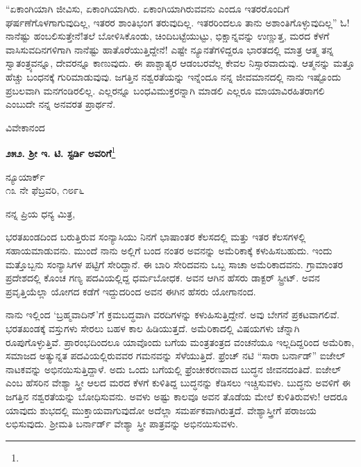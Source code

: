 \vspace{0.1cm}

“ಏಕಾಂಗಿಯಾಗಿ ಜೀವಿಸು, ಏಕಾಂಗಿಯಾಗಿರು. ಏಕಾಂಗಿಯಾಗಿರುವವನು ಎಂದೂ ಇತರರೊಂದಿಗೆ ಘರ್ಷಣೆಗೊಳಗಾಗುವುದಿಲ್ಲ, ಇತರರ ಶಾಂತಿಭಂಗ ತರುವುದಿಲ್ಲ. ಇತರರಿಂದಲೂ ತಾನು ಅಶಾಂತಿಗೊಳ್ಳುವುದಿಲ್ಲ” ಓ!ನಾನೆಷ್ಟು ಹಂಬಲಿಸುತ್ತೇನೆ!ತಲೆ ಬೋಳಿಸಿಕೊಂಡು, ಚಿಂದಿಬಟ್ಟೆಯುಟ್ಟು, ಭಿಕ್ಷಾನ್ನವನ್ನು ಉಣ್ಣುತ್ತ, ಮರದ ಕೆಳಗೆ ವಾಸಿಸುವದಿನಗಳಿಗಾಗಿ ನಾನೆಷ್ಟು ಹಾತೊರೆಯುತ್ತಿದ್ದೇನೆ! ಎಷ್ಟೇ ನ್ಯೂನತೆಗಳಿದ್ದರೂ ಭಾರತದಲ್ಲಿ ಮಾತ್ರ ಆತ್ಮ ತನ್ನ ಸ್ವಾತಂತ್ರ್ಯವನ್ನೂ, ದೇವರನ್ನೂ ಕಾಣುವುದು. ಈ ಪಾಶ್ಚಾತ್ಯರ ಆಡಂಬರವೆಲ್ಲ ಕೇವಲ ನಿಸ್ಸಾರವಾದುವು. ಆತ್ಮನನ್ನು ಮತ್ತೂ ಹೆಚ್ಚು ಬಂಧನಕ್ಕೆ ಗುರಿಮಾಡುವುವು. ಜಗತ್ತಿನ ನಶ್ವರತೆಯನ್ನು ಇನ್ನೆಂದೂ ನನ್ನ ಜೀವಮಾನದಲ್ಲಿ ನಾನು ಇಷ್ಟೊಂದು ಪ್ರಬಲವಾಗಿ ಮನಗಂಡಿರಲಿಲ್ಲ. ಎಲ್ಲರನ್ನೂ ಬಂಧವಿಮುಕ್ತರನ್ನಾಗಿ ಮಾಡಲಿ \enginline{-} ಎಲ್ಲರೂ ಮಾಯಾವಿರಹಿತರಾಗಲಿ ಎಂಬುದೇ ನನ್ನ ಅನವರತ ಪ್ರಾರ್ಥನೆ.

{\flushright
ವಿವೇಕಾನಂದ\par}

\begin{center}
\textbf{೨೫೨. ಶ‍್ರೀ ಇ. ಟಿ. ಸ್ಟರ್ಡಿ ಅವರಿಗೆ}\footnote{}
\end{center}

\vspace{-0.5cm}

\begin{flushright}
ನ್ಯೂಯಾರ್ಕ್\\೧೩ ನೇ ಫೆಬ್ರವರಿ, ೧೮೯೬
\end{flushright}

\vspace{-0.5cm}

\noindent
ನನ್ನ ಪ್ರಿಯ ಧನ್ಯ ಮಿತ್ರ,

ಭರತಖಂಡದಿಂದ ಬರುತ್ತಿರುವ ಸಂನ್ಯಾಸಿಯು ನಿನಗೆ ಭಾಷಾಂತರ ಕೆಲಸದಲ್ಲಿ ಮತ್ತು ಇತರ ಕೆಲಸಗಳಲ್ಲಿ ಸಹಾಯಮಾಡುವನು. ಮುಂದೆ ನಾನು ಅಲ್ಲಿಗೆ ಬಂದ ನಂತರ ಅವನನ್ನು ಅಮೆರಿಕಾಕ್ಕೆ ಕಳುಹಿಸಬಹುದು. ಇಂದು ಮತ್ತೊಬ್ಬನು ಸಂನ್ಯಾಸಿಗಳ ಪಟ್ಟಿಗೆ ಸೇರಿದ್ದಾನೆ. ಈ ಬಾರಿ ಸೇರಿದವನು ಒಬ್ಬ ಸಾಚಾ ಅಮೆರಿಕಾದವನು. ಗ್ರಾಮಾಂತರ ಪ್ರದೇಶದಲ್ಲಿ ಕೊಂಚ ಗಣ್ಯ ಪದವಿಯಲ್ಲಿದ್ದ ಧರ್ಮಬೋಧಕ. ಅವನ ಆಗಿನ ಹೆಸರು ಡಾಕ್ಟರ್ ಸ್ಟ್ರೀಟ್. ಅವನ ಪ್ರವೃತ್ತಿಯೆಲ್ಲಾ ಯೋಗದ ಕಡೆಗೆ ಇದ್ದುದರಿಂದ ಅವನ ಈಗಿನ ಹೆಸರು ಯೋಗಾನಂದ.

ನಾನು ಇಲ್ಲಿಂದ `ಬ್ರಹ್ಮವಾದಿನ್'ಗೆ ಕ್ರಮಬದ್ಧವಾಗಿ ವರದಿಗಳನ್ನು ಕಳುಹಿಸುತ್ತಿದ್ದೇನೆ. ಅವು ಬೇಗನೆ ಪ್ರಕಟವಾಗಲಿವೆ. ಭರತಖಂಡಕ್ಕೆ ವಸ್ತುಗಳು ಸೇರಲು ಬಹಳ ಕಾಲ ಹಿಡಿಯುತ್ತದೆ. ಅಮೆರಿಕಾದಲ್ಲಿ ವಿಷಯಗಳು ಚೆನ್ನಾಗಿ ರೂಪುಗೊಳ್ಳುತ್ತಿವೆ. ಪ್ರಾರಂಭದಿಂದಲೂ ಯಾವೊಂದು ಬಗೆಯ ಮಂತ್ರತಂತ್ರದ ವಂಚನೆಯೂ ಇಲ್ಲದಿದ್ದರಿಂದ ಅಮೆರಿಕಾ, ಸಮಾಜ\break ದ ಅತ್ಯುನ್ನತ ಪದವಿಯಲ್ಲಿರುವವರ ಗಮನವನ್ನು ಸೆಳೆಯುತ್ತಿದೆ. ಫ್ರೆಂಚ್ ನಟಿ ``ಸಾರಾ ಬರ್ನಾಡ್'' ಐಜೇಲ್ ನಾಟಕವನ್ನು ಅಭಿನಯಿಸುತ್ತಿದ್ದಾಳೆ. ಅದು ಒಂದು ಬಗೆಯಲ್ಲಿ ಫ್ರೆಂಚೀಕರಣವಾದ ಬುದ್ಧನ ಜೀವನದಂತಿದೆ. ಐಜೇಲ್ ಎಂಬ ಹೆಸರಿನ ವೇಶ್ಯಾ ಸ್ತ್ರೀ ಆಲದ ಮರದ ಕೆಳಗೆ ಕುಳಿತಿದ್ದ ಬುದ್ಧನನ್ನು ಕೆಡಿಸಲು ಇಚ್ಚಿಸುವಳು. ಬುದ್ಧನು ಅವಳಿಗೆ ಈ ಜಗತ್ತಿನ ನಶ್ವರತೆಯನ್ನು ಬೋಧಿಸುವನು. ಅವಳು ಅಷ್ಟು ಕಾಲವೂ ಅವನ ತೊಡೆಯ ಮೇಲೆ ಕುಳಿತಿರುವಳು! ಆದರೂ ಯಾವುದು ಶುಭದಲ್ಲಿ ಮುಕ್ತಾಯವಾಗುವುದೋ ಅದೆಲ್ಲಾ ಸಮರ್ಪಕವಾಗಿರುತ್ತದೆ. ವೇಶ್ಯಾಸ್ತ್ರೀಗೆ ಪರಾಜಯ ಲಭಿಸುವುದು. ಶ‍್ರೀಮತಿ ಬರ್ನಾರ್ಡ್ ವೇಶ್ಯಾ ಸ್ತ್ರೀ ಪಾತ್ರವನ್ನು ಅಭಿನಯಿಸುವಳು.

